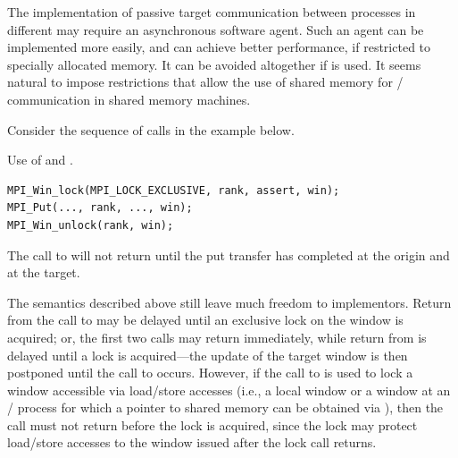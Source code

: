 \begin{rationale}
The implementation of passive target communication between processes in different 
may require an asynchronous software 
agent.  Such an agent can be implemented more easily, and can achieve
better performance, if restricted to specially allocated memory.  It
can be avoided altogether if  is used. It seems natural to
impose restrictions that allow the use of shared memory for
\RMA/ communication in shared memory machines.

\end{rationale}

Consider the sequence of calls in the example below.
\begin{example}
\label{ex:1sided-lock-unlock}%
%
Use of  and .
\begin{lstlisting}[language={[MPI]C}]
MPI_Win_lock(MPI_LOCK_EXCLUSIVE, rank, assert, win);
MPI_Put(..., rank, ..., win);
MPI_Win_unlock(rank, win);
\end{lstlisting}
The call to  will not return until the put
transfer has completed at the origin
and at the target.
\end{example}

\begin{implementors}
The semantics described above still leave much freedom to implementors.
Return from the call to
 may be delayed until an
exclusive lock on the window is acquired; or, the first
two calls may return immediately, while return from  is delayed until
a lock is acquired---the update of the target window is then
postponed until the call to  occurs.
However,  if the call to  is used to lock a
window accessible via load/store accesses (i.e., a local window or a window at an \MPI/ process
for which a pointer to shared memory can be obtained via ),
then the call must not return before the lock is acquired,
since the lock may protect load/store accesses to the window issued
after the lock call returns.
\end{implementors}

